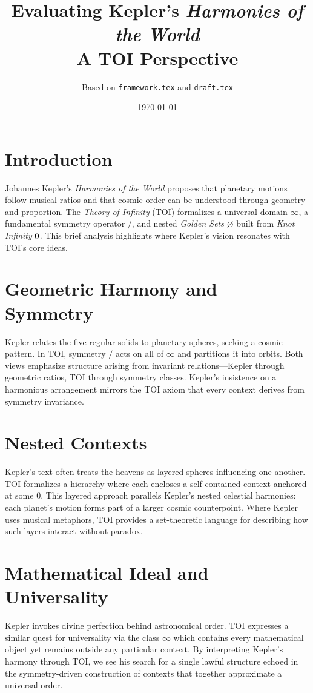 \documentclass[11pt]{article}
\title{\Huge\bfseries Evaluating Kepler's \emph{Harmonies of the World}\\[0.5em] \Large A TOI Perspective}
\author{\small Based on \texttt{framework.tex} and \texttt{draft.tex}}
\date{\today}
\newcommand{\symtry}{\mathbin{/}}
\newcommand{\goldenset}{\varnothing}
\newcommand{\knotinfinity}{\textnormal{0}}
\begin{document}
\maketitle

\section*{Introduction}
Johannes Kepler's \emph{Harmonies of the World} proposes that planetary motions follow musical ratios and that cosmic order can be understood through geometry and proportion. The \emph{Theory of Infinity} (TOI) formalizes a universal domain $\infty$, a fundamental symmetry operator $\symtry$, and nested \emph{Golden Sets} $\goldenset$ built from \emph{Knot Infinity} $\knotinfinity$. This brief analysis highlights where Kepler's vision resonates with TOI's core ideas.

\section*{Geometric Harmony and Symmetry}
Kepler relates the five regular solids to planetary spheres, seeking a cosmic pattern. In TOI, symmetry $\symtry$ acts on all of $\infty$ and partitions it into orbits. Both views emphasize structure arising from invariant relations---Kepler through geometric ratios, TOI through symmetry classes. Kepler's insistence on a harmonious arrangement mirrors the TOI axiom that every context derives from symmetry invariance.

\section*{Nested Contexts}
Kepler's text often treats the heavens as layered spheres influencing one another. TOI formalizes a hierarchy where each \goldenset{} encloses a self-contained context anchored at some \knotinfinity. This layered approach parallels Kepler's nested celestial harmonies: each planet's motion forms part of a larger cosmic counterpoint. Where Kepler uses musical metaphors, TOI provides a set-theoretic language for describing how such layers interact without paradox.

\section*{Mathematical Ideal and Universality}
Kepler invokes divine perfection behind astronomical order. TOI expresses a similar quest for universality via the class $\infty$ which contains every mathematical object yet remains outside any particular context. By interpreting Kepler's harmony through TOI, we see his search for a single lawful structure echoed in the symmetry-driven construction of contexts that together approximate a universal order.
\end{document}
